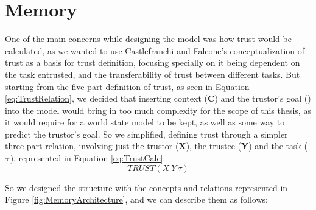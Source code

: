 \section{Memory}
\label{sec:Memory}
One of the main concerns while designing the model was how trust would be calculated, as we wanted to use Castlefranchi and Falcone's conceptualization of trust \cite{Castelfranchi2010} as a basis for trust definition, focusing specially on it being dependent on the task entrusted, and the transferability of trust between different tasks. But starting from the five-part definition of trust, as seen in Equation \ref{eq:TrustRelation}, we decided that inserting context (\textbf{C}) and the trustor's goal () into the model would bring in too much complexity for the scope of this thesis, as it would require for a world state model to be kept, as well as some way to predict the trustor's goal. So we simplified, defining trust through a simpler three-part relation, involving just the trustor (\textbf{X}), the trustee (\textbf{Y}) and the task ($\bm{\tau}$), represented in Equation \ref{eq:TrustCalc}.
\begin{equation}
TRUST(X\ Y\ \tau)
\label{eq:TrustCalc}
\end{equation}

So we designed the structure with the concepts and relations represented in Figure \ref{fig:MemoryArchitecture}, and we can describe them as follows:


